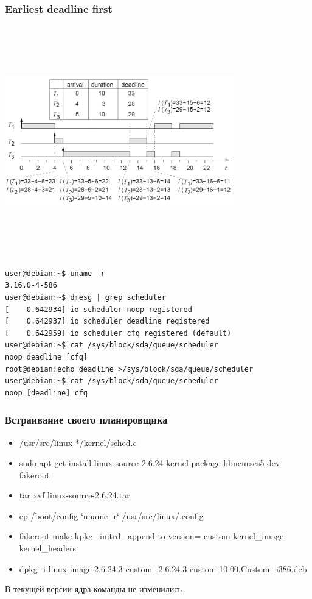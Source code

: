 \documentclass[10pt]{beamer}
\begin{document}
\begin{frame}\frametitle{Earliest deadline first}
\center
\includegraphics[width=10cm, height=10cm,keepaspectratio]{sched6}
\end{frame}

\begin{frame}[fragile]
\begin{lstlisting}
user@debian:~$ uname -r
3.16.0-4-586
user@debian:~$ dmesg | grep scheduler
[    0.642934] io scheduler noop registered
[    0.642937] io scheduler deadline registered
[    0.642959] io scheduler cfq registered (default)
user@debian:~$ cat /sys/block/sda/queue/scheduler 
noop deadline [cfq] 
root@debian:echo deadline >/sys/block/sda/queue/scheduler
user@debian:~$ cat /sys/block/sda/queue/scheduler 
noop [deadline] cfq 
\end{lstlisting}
\end{frame}

\begin{frame}\frametitle{Встраивание своего планировщика}
\begin{itemize}
\item /usr/src/linux-*/kernel/sched.c
\item sudo apt-get install linux-source-2.6.24 kernel-package libncurses5-dev fakeroot 
\item tar xvf linux-source-2.6.24.tar
\item cp /boot/config-`uname -r` /usr/src/linux/.config
\item fakeroot make-kpkg --initrd --append-to-version=-custom kernel\_image kernel\_headers 
\item dpkg -i linux-image-2.6.24.3-custom\_2.6.24.3-custom-10.00.Custom\_i386.deb
\end{itemize}
В текущей версии ядра команды не изменились
\end{frame}
\end{document}
